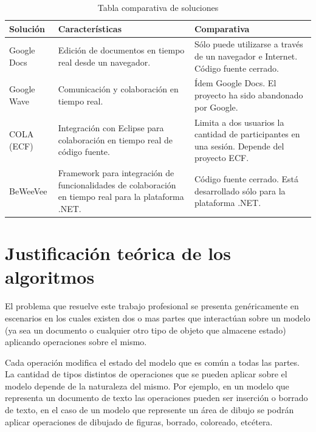\documentclass[12pt,a4paper]{article}
\begin{document}
\begin{table}[ht]
    \begin{tabular}{ | p{2.5cm} | p{5cm} | p{5cm} | }
    \hline
    Solución & Características & Comparativa \\ \hline

    Google Docs \cite{googledocs}& Edición de documentos en tiempo real desde un navegador. &
    Sólo puede utilizarse a través de un navegador e Internet. Código fuente cerrado. \\ \hline

    Google Wave \cite{googlewave} & Comunicación y colaboración en tiempo real. &
    Ídem Google Docs. El proyecto ha sido abandonado por Google. \\ \hline

    COLA \cite{cola} (ECF) & Integración con Eclipse para colaboración en tiempo real de código fuente. &
	Limita a dos usuarios la cantidad de participantes en una sesión. Depende del proyecto ECF. \\ \hline

    BeWeeVee \cite{beweevee} & Framework para integración de funcionalidades de colaboración en tiempo real para
    la plataforma .NET. & Código fuente cerrado. Está desarrollado sólo para la plataforma .NET. \\ \hline

    \end{tabular}
    \caption{\label{soluciones_comparacion} Tabla comparativa de soluciones}
\end{table}

	\section{Justificación teórica de los algoritmos}
	
	El problema que resuelve este trabajo profesional se presenta genéricamente en escenarios en los cuales 
	existen dos o mas partes que interactúan sobre un modelo (ya sea un documento o cualquier otro tipo de 
	objeto que almacene estado) aplicando operaciones sobre el mismo.
	
	Cada operación modifica el estado del modelo que es común a todas las partes. La cantidad de tipos distintos
	de operaciones que se pueden aplicar sobre el modelo depende de la naturaleza del mismo. Por ejemplo, en un
	modelo que representa un documento de texto las operaciones pueden ser inserción o borrado de texto, en el caso
	de un modelo que represente un área de dibujo se podrán aplicar operaciones de dibujado de figuras, 
	borrado, coloreado, etcétera.
	
\end{document}
